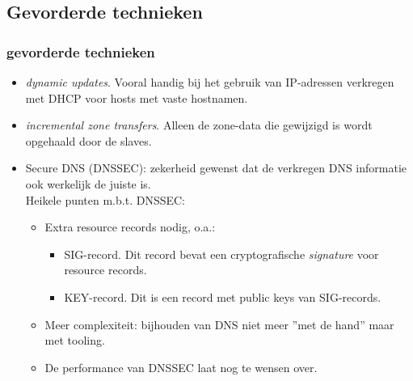 \subsection{Gevorderde technieken}
\begin{styleframe}
        \frametitle{gevorderde technieken}
\begin{itemize}
	\item {\it dynamic updates}. Vooral handig bij het gebruik van IP-adressen verkregen met DHCP voor hosts met vaste hostnamen.
	\pause
	\item {\it incremental zone transfers}. Alleen de zone-data die gewijzigd is wordt opgehaald door de slaves.
	\pause
	\item Secure DNS (DNSSEC): zekerheid gewenst dat de verkregen DNS informatie ook werkelijk de juiste is.\\
	\pause
Heikele punten m.b.t. DNSSEC:
	\begin{itemize}
		\item Extra resource records nodig, o.a.:
		\begin{itemize}
			\item SIG-record. Dit record bevat een cryptografische {\it signature} voor resource records.
			\item KEY-record. Dit is een record met public keys van SIG-records.
		\end{itemize}
		\pause
		\item Meer complexiteit: bijhouden van DNS niet meer ''met de hand'' maar met tooling.
		\pause
		\item De performance van DNSSEC laat nog te wensen over.
	\end{itemize}
\end{itemize}
\end{styleframe}

